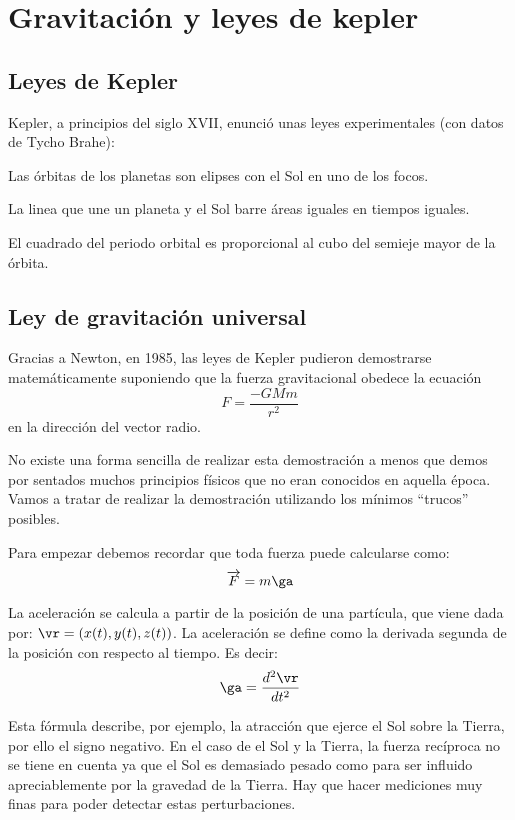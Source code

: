 
\chapter{Gravitación y leyes de kepler}
\section{Leyes de Kepler}

Kepler, a principios del siglo XVII, enunció unas leyes experimentales (con datos de Tycho Brahe):

\begin{lemma}
	Las órbitas de los planetas son elipses con el Sol en uno de los focos.
\end{lemma}

\begin{lemma}
	La linea que une un planeta y el Sol barre áreas iguales en tiempos iguales.
\end{lemma}

\begin{lemma}
	El cuadrado del periodo orbital es proporcional al cubo del semieje mayor de la órbita.
\end{lemma}

\section{Ley de gravitación universal}

Gracias a Newton, en 1985, las leyes de Kepler pudieron demostrarse matemáticamente suponiendo que la fuerza gravitacional obedece la ecuación
\[ F = \frac{-GMm}{r^2} \]
en la dirección del vector radio.

No existe una forma sencilla de realizar esta demostración a menos que demos por sentados muchos principios físicos que no eran conocidos en aquella época. Vamos a tratar de realizar la demostración utilizando los mínimos ``trucos'' posibles.

Para empezar debemos recordar que toda fuerza puede calcularse como:
$$ \overrightarrow{F} = m\ga$$

La aceleración se calcula a partir de la posición de una partícula, que viene dada por: $\vr = (x(t), y(t), z(t))$. La aceleración se define como la derivada segunda de la posición con respecto al tiempo. Es decir:
\[ \ga = \frac{d^2\vr}{d t^2} \]

Esta fórmula describe, por ejemplo, la atracción que ejerce el Sol sobre la Tierra, por ello el signo negativo. En el caso de el Sol y la Tierra, la fuerza recíproca no se tiene en cuenta ya que el Sol es demasiado pesado como para ser influido apreciablemente por la gravedad de la Tierra. Hay que hacer mediciones muy finas para poder detectar estas perturbaciones.


